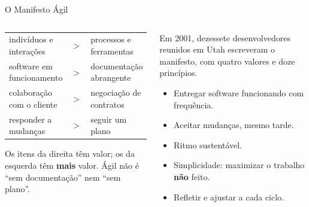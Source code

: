 \documentclass[aspectratio=169,10pt]{beamer}
\begin{document}
\begin{frame}{O Manifesto Ágil}
  \begin{columns}[T]
    \begin{column}{0.54\textwidth}
      \scriptsize
      \begin{tabularx}{\linewidth}{@{}L c L@{}}
        \toprule
         & &  \\
        \midrule
        indivíduos e interações & $>$ & processos e ferramentas \\
        software em funcionamento & $>$ & documentação abrangente \\
        colaboração com o cliente & $>$ & negociação de contratos \\
        responder a mudanças & $>$ & seguir um plano \\
        \bottomrule
      \end{tabularx}
      \begin{conceito}
        Os itens da direita têm valor; os da esquerda têm \textbf{mais} valor. Ágil não é ``sem documentação'' nem ``sem plano''.
      \end{conceito}
    \end{column}
    \begin{column}{0.44\textwidth}
      \begin{historia}
        Em 2001, dezessete desenvolvedores reunidos em Utah escreveram o manifesto, com quatro valores e doze princípios.
      \end{historia}
      \begin{conceito}
        \begin{itemize}
          \item Entregar software funcionando com frequência.
          \item Aceitar mudanças, mesmo tarde.
          \item Ritmo sustentável.
          \item Simplicidade: maximizar o trabalho \textbf{não} feito.
          \item Refletir e ajustar a cada ciclo.
        \end{itemize}
      \end{conceito}
    \end{column}
  \end{columns}
\end{frame}
\end{document}
